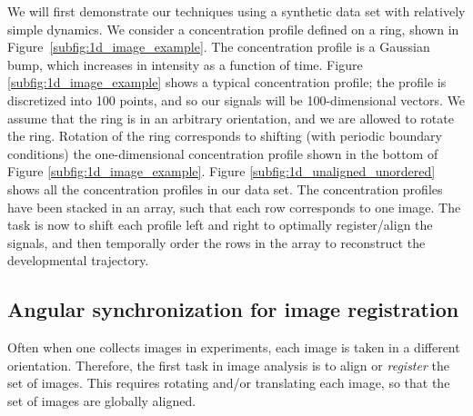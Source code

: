 \documentclass{pnastwo}
\begin{document}
\begin{article}
We will first demonstrate our techniques using a synthetic data set with relatively simple dynamics.
%
We consider a concentration profile defined on a ring, shown in Figure~\ref{subfig:1d_image_example}.
%
The concentration profile is a Gaussian bump, which increases in intensity as a function of time.
%
Figure \ref{subfig:1d_image_example} shows a typical concentration profile; the profile is discretized into 100 points, and so our signals will be 100-dimensional vectors. 
%
We assume that the ring is in an arbitrary orientation, and we are allowed to rotate the ring.
%
Rotation of the ring corresponds to shifting (with periodic boundary conditions) the one-dimensional concentration profile shown in the bottom of Figure \ref{subfig:1d_image_example}. 
%
Figure \ref{subfig:1d_unaligned_unordered} shows all the concentration profiles in our data set. 
%
The concentration profiles have been stacked in an array, such that each row corresponds to one image.
%
The task is now to shift each profile left and right to optimally register/align the signals, and then temporally order the rows in the array to reconstruct the developmental trajectory.

\subsection{Angular synchronization for image registration}

Often when one collects images in experiments, each image is taken in a different orientation. 
%
Therefore, the first task in image analysis is to align or {\em register} the set of images. 
%
This requires rotating and/or translating each image, so that the set of images are globally aligned.


\end{article}
\end{document}
